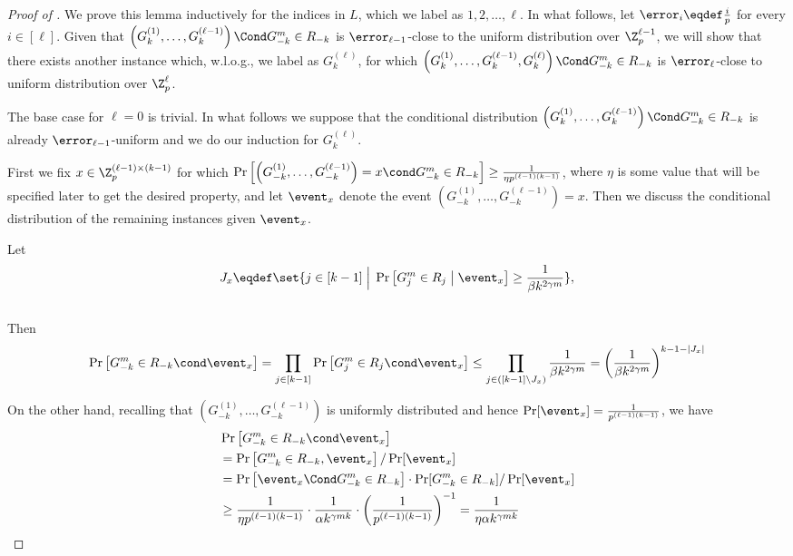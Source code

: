 	\begin{proof}[Proof of ]
		We prove this lemma inductively for the indices in $L$, {\color{black}which we label as $1,2, \dots, \ell$.}
		In what follows, let $\error_{i}\eqdef \frac{i}{p}$ for every $i\in [\ell]$.
		Given that $\left(G_k^{(1)},\dots,G_k^{(\ell-1)}\right)\Cond G_{-k}^m \in R_{-k}$ is $\error_{\ell-1}$-close to the uniform distribution over $\Z_p^{\ell-1}$, we will show that there exists another instance which, w.l.o.g., we label as $G_k^{(\ell)} $, for which 
		$\left(G_k^{(1)},\dots,G_k^{(\ell-1)},G_k^{(\ell)}\right)\Cond G_{-k}^m \in R_{-k}$ is $\error_{\ell}$-close to uniform distribution over $\Z_p^{\ell}$.
		
		The base case for $\ell=0$ is trivial. 
		In what follows we suppose that the conditional distribution $\left(G_k^{(1)},\dots,G_k^{(\ell-1)}\right)\Cond G_{-k}^m \in R_{-k}$ is already $\error_{\ell-1}$-uniform and we do our induction for $G_k^{(\ell)}$.

		First we fix $x\in \Z_p^{(\ell-1)\times (k-1)}$ for which $\Pr\left[\left(G_{-k}^{(1)},\dots,G_{-k}^{(\ell-1)}\right)=x \cond G_{-k}^m\in R_{-k} \right] \ge \frac{1}{\eta  p^{(\ell-1)(k-1)}}$, {\color{black} where $\eta$ is some value that will be specified later to get the desired property,}
		and let $\event_x$ denote  the event 
		$\left(G_{-k}^{(1)},\dots,G_{-k}^{(\ell-1)}\right)=x$.  
		Then we discuss the conditional distribution of the remaining instances given $\event_x$.


		Let
		$$J_x \eqdef \set{j\in [k-1] \; \Big| \; \Pr\left[G^m_j\in R_j\; \big| \; \event_x\right] \ge \frac{1}{\beta k^{2\gamma m}} },$$
		\\
		Then
		\begin{align}\label{ineq:A1_upper}
			\Pr\left[ G^m_{-k}\in R_{-k} \cond \event_x \right] =
		\prod_{j\in [k-1]} 
			\Pr\left[ G_j^m\in R_j \cond  \event_x \right]
			\le 
			\prod_{j\in ([k-1]\backslash J_x)} \frac{1}{\beta k^{2\gamma m}} = \left( \frac{1}{\beta k^{2\gamma m}} \right)^{k-1-|J_x|}
		\end{align}


		On the other hand, recalling that $\left(G_{-k}^{(1)},\dots,G_{-k}^{(\ell-1)}\right)$ is uniformly distributed and hence $\Pr[\event_x]=\frac{1}{p^{(\ell-1)(k-1)}}$, we have
		\begin{align}
			& \Pr\left[ G^m_{-k}\in R_{-k} \cond \event_x \right] \notag \\
			&=\Pr\left[G^m_{-k}\in R_{-k},\event_x\right] / \Pr[\event_x]
			\notag\\
			&= \Pr\left[ \event_x \Cond G_{-k}^m\in R_{-k} \right] \cdot \Pr[G_{-k}^m\in R_{-k}]/\Pr[\event_x] \notag \\
			&\ge  \frac{1}{\eta p^{(\ell-1)(k-1)}} \cdot \frac{1}{\alpha k^{\gamma mk}} \cdot \left(\frac{1}{p^{(\ell-1)(k-1)}}\right)^{-1}
			=\frac{1}{\eta \alpha k^{\gamma mk}}
			\label{ineq:A1_lower}
		\end{align}


\end{proof}
